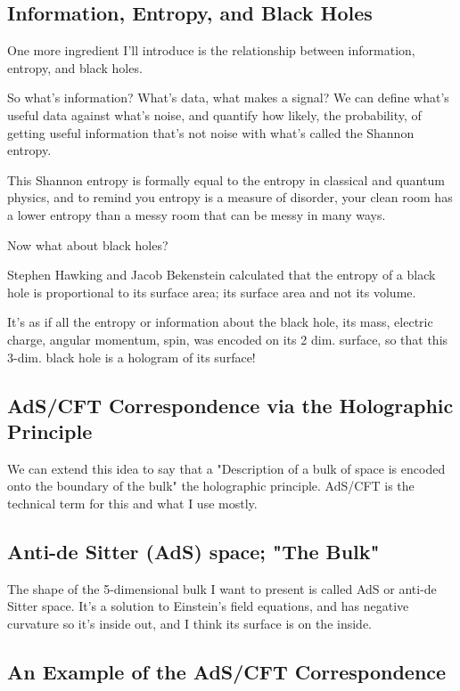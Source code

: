 \documentclass[10pt]{amsart}
\begin{document}
\subsection{Information, Entropy, and Black Holes}

One more ingredient I'll introduce is the relationship between information, entropy, and black holes. 

So what's information? What's data, what makes a signal? We can define what's useful data against what's noise, and quantify how likely, the probability, of getting useful information that's not noise with what's called the Shannon entropy. 

This Shannon entropy is formally equal to the entropy in classical and quantum physics, and to remind you entropy is a measure of disorder, your clean room has a lower entropy than a messy room that can be messy in many ways.

Now what about black holes?

Stephen Hawking and Jacob Bekenstein calculated that the entropy of a black hole is proportional to its surface area; its surface area and not its volume.

It's as if all the entropy or information about the black hole, its mass, electric charge, angular momentum, spin, was encoded on its 2 dim. surface, so that this 3-dim. black hole is a hologram of its surface!

\subsection{AdS/CFT Correspondence via the Holographic Principle}

We can extend this idea to say that a "Description of a bulk of space is encoded onto the boundary of the bulk" the holographic principle. AdS/CFT is the technical term for this and what I use mostly.

\subsection{Anti-de Sitter (AdS) space; "The Bulk"}

The shape of the 5-dimensional bulk I want to present is called AdS or anti-de Sitter space. It's a solution to Einstein's field equations, and has negative curvature so it's inside out, and I think its surface is on the inside.

\subsection{An Example of the AdS/CFT Correspondence}
\end{document}
